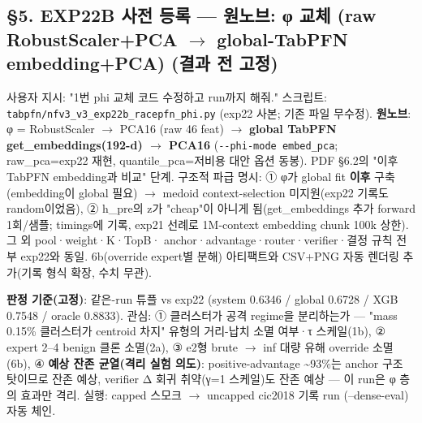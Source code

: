 \subsection{§5. EXP22B 사전 등록 — 원노브: φ 교체 (raw RobustScaler+\allowbreak{}PCA  \ensuremath{\rightarrow}  global-TabPFN embedding+\allowbreak{}PCA) (결과 전 고정)}
사용자 지시: "1번 phi 교체 코드 수정하고 run까지 해줘." 스크립트: \texttt{tabpfn/\allowbreak{}\allowbreak{}n\allowbreak{}fv3\_\allowbreak{}\allowbreak{}v3\_\allowbreak{}\allowbreak{}e\allowbreak{}xp22b\_\allowbreak{}\allowbreak{}ra\allowbreak{}cepfn\_\allowbreak{}\allowbreak{}ph\allowbreak{}i.\allowbreak{}py} (exp22 사본; 기존 파일 무수정). \textbf{원노브}: φ =\allowbreak{} RobustScaler \ensuremath{\rightarrow} PCA16 (raw 46 feat)  \ensuremath{\rightarrow}  \textbf{global TabPFN get\_\allowbreak{}embeddings(192-d)  \ensuremath{\rightarrow}  PCA16} (\texttt{-\allowbreak{}-\allowbreak{}phi-\allowbreak{}mo\allowbreak{}de embed\allowbreak{}\_\allowbreak{}\allowbreak{}pca}; raw\_\allowbreak{}pca=\allowbreak{}exp22 재현, quantile\_\allowbreak{}pca=\allowbreak{}저비용 대안 옵션 동봉). PDF §6.2의 "이후 TabPFN embedding과 비교" 단계. 구조적 파급 명시: ① φ가 global fit \textbf{이후} 구축(embedding이 global 필요)  \ensuremath{\rightarrow}  medoid context-selection 미지원(exp22 기록도 random이었음), ② h\_\allowbreak{}pre의 z가 "cheap"이 아니게 됨(get\_\allowbreak{}embeddings 추가 forward 1회/\allowbreak{}샘플; timings에 기록, exp21 선례로 1M-context embedding chunk 100k 상한). 그 외 pool·weight·K·TopB· anchor·advantage·router·verifier·결정 규칙 전부 exp22와 동일. 6b(override expert별 분해) 아티팩트와 CSV+\allowbreak{}PNG 자동 렌더링 추가(기록 형식 확장, 수치 무관).

\textbf{판정 기준(고정)}: 같은-run 튜플 vs exp22 (system 0.6346 /\allowbreak{} global 0.6728 /\allowbreak{} XGB 0.7548 /\allowbreak{} oracle 0.8833). 관심: ① 클러스터가 공격 regime을 분리하는가 — "mass 0.15\% 클러스터가 centroid 차지" 유형의 거리-납치 소멸 여부·τ 스케일(1b), ② expert 2–4 benign 클론 소멸(2a), ③ e2형 brute \ensuremath{\rightarrow} inf 대량 유해 override 소멸(6b), ④ \textbf{예상 잔존 균열(격리 실험 의도)}: positive-advantage \textasciitilde{}93\%는 anchor 구조 탓이므로 잔존 예상, verifier Δ 회귀 취약(γ=\allowbreak{}1 스케일)도 잔존 예상 — 이 run은 φ 층의 효과만 격리. 실행: capped 스모크  \ensuremath{\rightarrow}  uncapped cic2018 기록 run (--dense-eval) 자동 체인.

